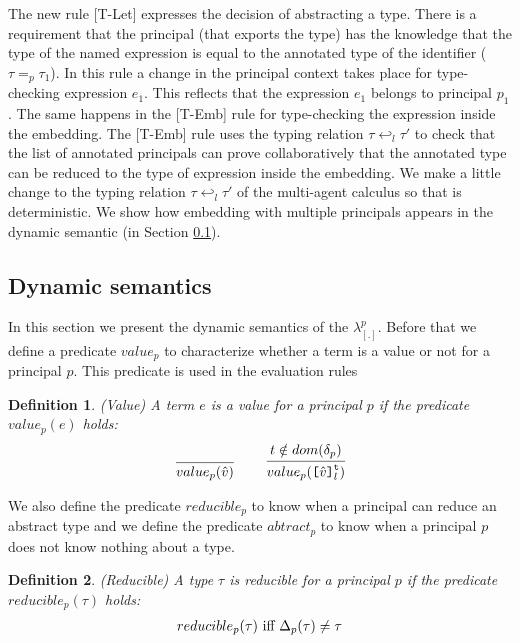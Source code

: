\documentclass{article}
\newcommand{\emb}[3]{\texttt{[}#1\texttt{]}_{#2}^{#3}}
\newcommand{\pabstract}[0]{$abtract_p$}
\newcommand\irname[1]{[#1]}
\newcommand\newcalculus[0]{$\lambda^p_{\left[.\right]}$}
\newtheorem{definition}{Definition}[section]
\begin{document}
The new rule \irname{T-Let} expresses the decision of abstracting a type. There is a requirement that  the principal (that exports the type) has the knowledge that the type of the named expression is equal to the annotated type of the identifier ($\tau =_p \tau_1$). In this rule a change in the principal context takes place for type-checking expression $e_1$. This reflects that the expression $e_1$ belongs to principal $p_1$. The same happens in the \irname{T-Emb} rule for type-checking the expression inside the embedding. The \irname{T-Emb} rule uses the typing relation $\tau \hookleftarrow_l \tau'$ to check that the list of annotated principals can prove collaboratively that the annotated type can be reduced to the type of expression inside the embedding. We make a little change to the typing relation $\tau \hookleftarrow_l \tau'$ of the multi-agent calculus so that is deterministic. We show how embedding with multiple principals appears in the dynamic semantic (in Section \ref{sec:uc_dyn_semantics}).


\subsection{Dynamic semantics}\label{sec:uc_dyn_semantics}
In this section we present the dynamic semantics of the \newcalculus{}. Before that we define a predicate $value_p$ to characterize whether a term is a value or not for a principal $p$. This predicate is used in the evaluation rules	
	\begin{definition}{(Value)} A term $e$ is a value for a principal $p$ if the predicate $value_p(e)$ holds:	
	\[
	\begin{tabular}{l l}
	\infer[] 
	{value_p(\hat{v})}
	{}
	& 
	\infer[] 
	{value_p(\emb{\hat{v}}{l}{\texttt{t}})}
	{t \notin dom(\delta_p)}
	\end{tabular}
	\]	
	\end{definition}
	
	
We also define the predicate $reducible_p$ to know when a principal can reduce an abstract type and we define the predicate \pabstract{} to know when a principal $p$ does not know nothing about a type.
	\begin{definition}{(Reducible)} A type $\tau$ is reducible for a principal $p$ if the predicate $reducible_p(\tau)$ holds:
	\[
	\begin{tabular}{c}	
	$reducible_p(\tau)$ iff $\Delta_p(\tau) \neq \tau$	
	\end{tabular}
	\]
	\end{definition}
	
\end{document}
